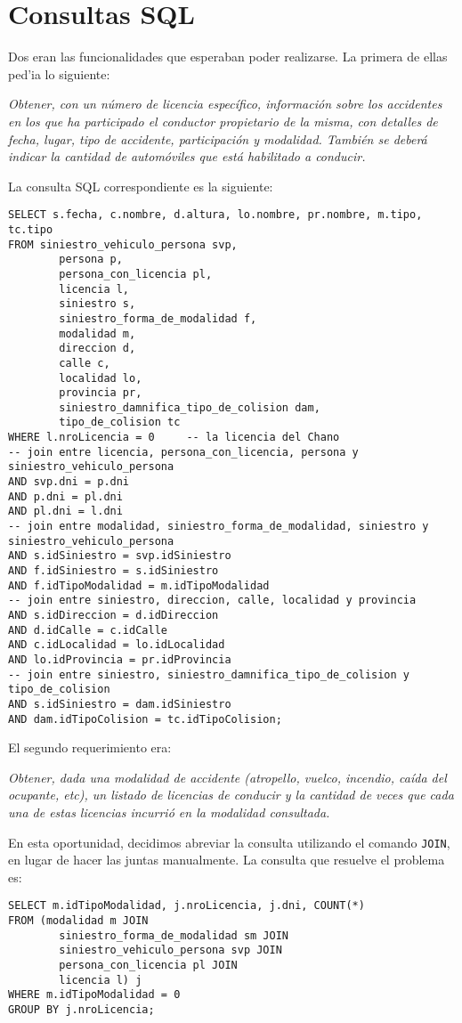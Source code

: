 \section{Consultas SQL}

Dos eran las funcionalidades que esperaban poder realizarse. La primera de ellas ped'ia lo siguiente:

\textit{Obtener, con un número de licencia específico,
información sobre los accidentes en los que ha participado el conductor propietario de
la misma, con detalles de fecha, lugar, tipo de accidente, participación y modalidad.
También se deberá indicar la cantidad de automóviles que está habilitado a conducir.}

La consulta SQL correspondiente es la siguiente:

\begin{verbatim}
SELECT s.fecha, c.nombre, d.altura, lo.nombre, pr.nombre, m.tipo, tc.tipo
FROM siniestro_vehiculo_persona svp, 
        persona p, 
        persona_con_licencia pl, 
        licencia l, 
        siniestro s,
        siniestro_forma_de_modalidad f, 
        modalidad m, 
        direccion d, 
        calle c, 
        localidad lo, 
        provincia pr, 
        siniestro_damnifica_tipo_de_colision dam, 
        tipo_de_colision tc
WHERE l.nroLicencia = 0		-- la licencia del Chano
-- join entre licencia, persona_con_licencia, persona y siniestro_vehiculo_persona
AND svp.dni = p.dni
AND p.dni = pl.dni
AND pl.dni = l.dni
-- join entre modalidad, siniestro_forma_de_modalidad, siniestro y siniestro_vehiculo_persona
AND s.idSiniestro = svp.idSiniestro
AND f.idSiniestro = s.idSiniestro
AND f.idTipoModalidad = m.idTipoModalidad
-- join entre siniestro, direccion, calle, localidad y provincia
AND s.idDireccion = d.idDireccion
AND d.idCalle = c.idCalle
AND c.idLocalidad = lo.idLocalidad
AND lo.idProvincia = pr.idProvincia
-- join entre siniestro, siniestro_damnifica_tipo_de_colision y tipo_de_colision
AND s.idSiniestro = dam.idSiniestro
AND dam.idTipoColision = tc.idTipoColision;
\end{verbatim}

El segundo requerimiento era:

\textit{Obtener, dada una modalidad de accidente (atropello, vuelco, incendio, caída del ocupante, etc), un listado de licencias de conducir y la cantidad de veces que cada una de estas licencias incurrió en la modalidad consultada.}

En esta oportunidad, decidimos abreviar la consulta utilizando el comando \texttt{JOIN}, en lugar de hacer las juntas manualmente. La consulta que resuelve el problema es:

\begin{verbatim}
SELECT m.idTipoModalidad, j.nroLicencia, j.dni, COUNT(*)
FROM (modalidad m JOIN 
        siniestro_forma_de_modalidad sm JOIN 
        siniestro_vehiculo_persona svp JOIN 
        persona_con_licencia pl JOIN 
        licencia l) j
WHERE m.idTipoModalidad = 0
GROUP BY j.nroLicencia;
\end{verbatim}